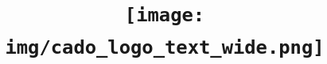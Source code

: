 \documentclass[
12pt, %
a4paper, %
oneside, %
headinclude,footinclude, %
BCOR5mm, %
]{scrartcl}
\title{\texttt{[image: img/cado\_logo\_text\_wide.png]} \\ \normalfont\spacedallcaps{Installation Guide} \\
\vspace*{\fill}}%
\begin{document}
\newcommand{\titlebox}[2]{
\begin{tikzpicture}
\node[draw,thick,inner sep=6mm] (titlebox) {#2};
\node[fill=white] (Title) at (titlebox.north) {\bfseries \large #1};
\end{tikzpicture}
}
\renewcommand{\sectionmark}[1]{\markright{\spacedlowsmallcaps{#1}}} %

\newcommand{\titledframe}[2]{%
       \boxput*(0,1){\psframebox*{#1}}%
         {\psframebox[framesep=12pt]{#2}}}
         
\pagestyle{scrheadings} %


\date{}
\maketitle %
\thispagestyle{empty}

\setcounter{tocdepth}{2} %
\newpage
\setcounter{page}{1}
\tableofcontents %



\end{document}
